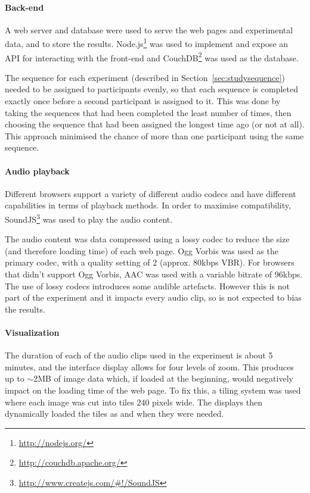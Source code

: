 \paragraph{Back-end}
A web server and database were used to serve the web pages and experimental data, and to store the results.
Node.js\footnote{\url{http://nodejs.org/}} was used to implement and expose an API for interacting with the front-end
and CouchDB\footnote{\url{http://couchdb.apache.org/}} was used as the database.

The sequence for each experiment (described in Section~\ref{sec:studysequence}) needed to be assigned to participants
evenly, so that each sequence is completed exactly once before a second participant is assigned to it. This was done by
taking the sequences that had been completed the least number of times, then choosing the sequence that had been
assigned the longest time ago (or not at all). This approach minimised the chance of more than one participant using
the same sequence. 

\paragraph{Audio playback}
Different browsers support a variety of different audio codecs and have different capabilities in terms of playback
methods. In order to maximise compatibility, SoundJS\footnote{\url{http://www.createjs.com/\#!/SoundJS}} was used to
play the audio content.

The audio content was data compressed using a lossy codec to reduce the size (and therefore loading time) of each web
page. Ogg Vorbis was used as the primary codec, with a quality setting of 2 (approx. 80kbps VBR). For browsers that
didn't support Ogg Vorbis, AAC was used with a variable bitrate of 96kbps.  The use of lossy codecs introduces some
audible artefacts. However this is not part of the experiment and it impacts every audio clip, so is not expected to
bias the results. 

\paragraph{Visualization}
The duration of each of the audio clips used in the experiment is about 5 minutes, and the interface display allows for
four levels of zoom. This produces up to $\sim$2MB of image data which, if loaded at the beginning, would negatively
impact on the loading time of the web page. To fix this, a tiling system was used where each image was cut into tiles
240 pixels wide. The displays then dynamically loaded the tiles as and when they were needed.

